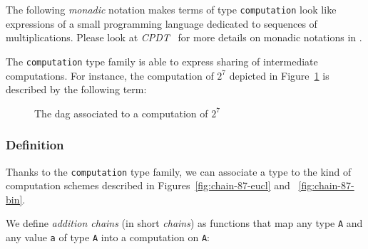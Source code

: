 
The following \emph{monadic} 
notation makes terms of type \texttt{computation} look like
expressions of a small programming language dedicated to sequences of multiplications.
Please look at \emph{CPDT}~\cite{chlipalacpdt2011} for more details on monadic notations in \coq.
\label{monadic-mult}


The \texttt{computation} type family is able to express sharing of intermediate computations. For instance, the computation of $2^7$ depicted in Figure~\ref{fig:dag7} is described by  the following term:


\begin{figure}[h]
  \centering
  \caption{The dag associated to a computation of $2^7$}
  \label{fig:dag7}
\end{figure}

\subsubsection{Definition}
\label{chain-def}

Thanks to the  \texttt{computation} type family, we can associate a type
to the kind of computation schemes described in Figures~\ref{fig:chain-87-eucl} and ~\ref{fig:chain-87-bin}.

We define 
 \emph{addition chains} (in short  \emph{chains}) as functions that map
 any
 type \texttt{A} and any value \texttt{a} of type \texttt{A}  into a computation 
on \texttt{A}:

